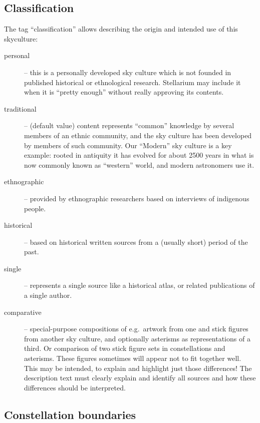\subsection{Classification}
\label{SC:classification}

The tag ``classification'' allows describing the origin and intended use of this skyculture:
\begin{description}
  \item[personal] -- this is a personally developed sky culture which
    is not founded in published historical or ethnological research. Stellarium
    may include it when it is ``pretty enough'' without really
    approving its contents.
  \item[traditional] -- (default value) content represents ``common'' knowledge by
    several members of an ethnic community, and the sky culture has
    been developed by members of such community. Our ``Modern''
    sky culture is a key example: rooted in antiquity it has evolved for about 2500 years in what is now commonly known as ``western'' world,
    and modern astronomers use it.
  \item[ethnographic] -- provided by ethnographic researchers based on
    interviews of indigenous people.
  \item[historical] -- based on historical written sources from a
    (usually short) period of the past.
  \item[single] -- represents a single source like a historical atlas,
    or related publications of a single author.
  \item[comparative] -- special-purpose compositions  of e.g.\ artwork
    from one and stick figures from another sky culture, and optionally
    asterisms as representations of a third. Or comparison of two
    stick figure sets in constellations and asterisms. These figures
    sometimes will appear not to fit together well. This may be
    intended, to explain and highlight just those differences! The
    description text must clearly explain and identify all sources and
    how these differences should be interpreted.
\end{description}


\subsection{Constellation boundaries}
\label{SC:boundaries}
\label{SC:edges}


